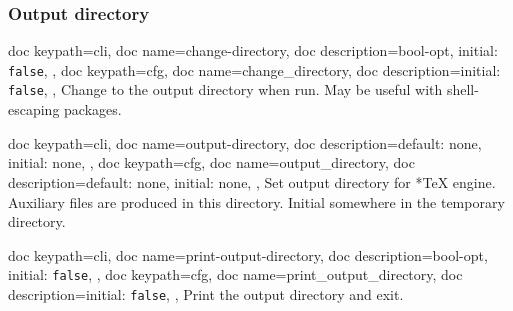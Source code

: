 \documentclass[a4paper, 11pt]{scrartcl}
\let\TeXold\TeX
\renewcommand\TeX{\TeXold\xspace}
\begin{document}
\subsubsection{Output directory}
\begin{docKeys}[
	]{
		{
			doc keypath=cli,
			doc name=change-directory,
			doc description={bool-opt, initial: \texttt{false}},
		},
		{
			doc keypath=cfg,
			doc name=change_directory,
			doc description={initial: \texttt{false}},
		},
	}
	Change to the output directory when run.
	May be useful with shell-escaping packages.
\end{docKeys}
\begin{docKeys}[
		doc parameter={=\meta{output\_directory}},
	]{
		{
			doc keypath=cli,
			doc name=output-directory,
			doc description={default: none, initial: none},
		},
		{
			doc keypath=cfg,
			doc name=output_directory,
			doc description={default: none, initial: none},
		},
	}
	Set output directory for *\TeX engine.
	Auxiliary files are produced in this directory.
	Initial somewhere in the temporary directory.
\end{docKeys}
\begin{docKeys}[
	]{
		{
			doc keypath=cli,
			doc name=print-output-directory,
			doc description={bool-opt, initial: \texttt{false}},
		},
		{
			doc keypath=cfg,
			doc name=print_output_directory,
			doc description={initial: \texttt{false}},
		},
	}
	Print the output directory and exit.
\end{docKeys}
\end{document}
